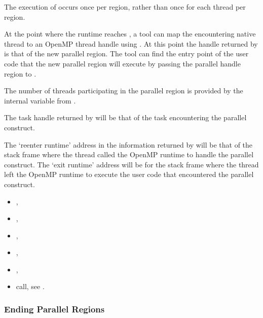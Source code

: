The execution of 
occurs once per region, rather than once for each thread per region.

At the point where the runtime reaches ,
a tool can map the encountering native thread to an OpenMP
thread handle using
.
At this point the handle returned by 
is that of the new parallel region.
The tool can find the entry point of the user code that
the new parallel region will execute by passing the parallel handle region
to .

The number of threads participating in the parallel region is provided by
the internal variable  from .

The task handle returned by
will be that of the task encountering the parallel construct.

The `reenter runtime' address in the information returned by
will be that of the stack frame where the thread called the OpenMP
runtime to handle the parallel construct.
The `exit runtime' address will be for the stack frame where the thread
left the OpenMP runtime to execute the user code that encountered
the parallel construct.


\crossreferences

\begin{itemize}
\item
  , 
\item
  , 
\item
  , 
\item
  , 
\item
  , 
\item {} call, see 
  .
\end{itemize}





\subsubsection{Ending Parallel Regions}
\label{subsubsec:ompd_bp_parallel_end}

